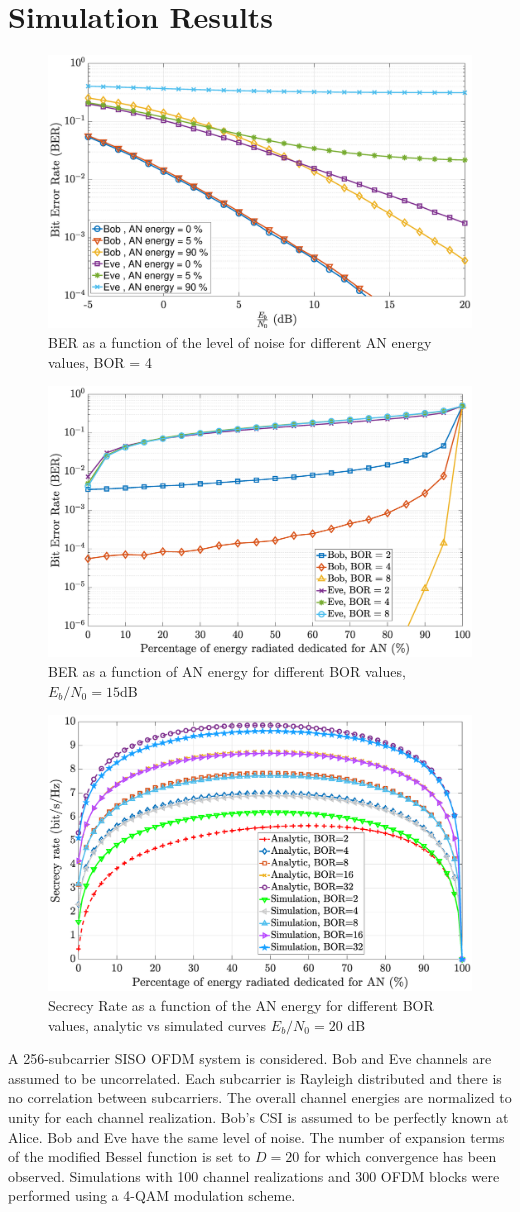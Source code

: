 \documentclass[conference]{IEEEtran}
\begin{document}
\section{Simulation Results}
\begin{figure}[t]
    \centering
    \centerline{\includegraphics[width = .4\textwidth]{img/ber_ebno_alpha_bor_globcom.eps}}
    \caption{BER as a function of the level of noise for different AN energy values, BOR = 4}
    \label{fig:ber_ebno}
\end{figure}

\begin{figure}[t]
    \centering
    \centerline{\includegraphics[width = .4\textwidth]{img/ber_alpha_bor_ebno_globcom.eps}}
    \caption{BER as a function of AN energy for different BOR values, $E_b/N_0 = 15$dB}
    \label{fig:ber_alpha}
\end{figure}


\begin{figure}[t]
    \centering
    \centerline{\includegraphics[width = .43\textwidth]{img/ICNC_simu_anal.eps}}
    \caption{Secrecy Rate as a function of the AN energy for different BOR values, analytic vs simulated curves $E_b/N_0=20$ dB }
    \label{fig:secrecy_alpha_bor}
\end{figure}

\label{sec:result}
A 256-subcarrier SISO OFDM system is considered. Bob and Eve channels are assumed to be uncorrelated. Each subcarrier is Rayleigh distributed and there is no correlation between subcarriers. The overall channel energies are normalized to unity for each channel realization. Bob's CSI is assumed to be perfectly known at Alice. Bob and Eve have the same level of noise. The number of expansion terms of the modified Bessel function is set to $D=20$ for which convergence has been observed. Simulations with 100 channel realizations and 300 OFDM blocks were performed using a 4-QAM modulation scheme. 
\end{document}
